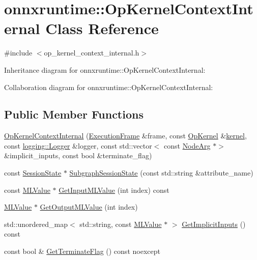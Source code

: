 \hypertarget{classonnxruntime_1_1OpKernelContextInternal}{}\section{onnxruntime\+:\+:Op\+Kernel\+Context\+Internal Class Reference}
\label{classonnxruntime_1_1OpKernelContextInternal}


{\ttfamily \#include $<$op\+\_\+kernel\+\_\+context\+\_\+internal.\+h$>$}



Inheritance diagram for onnxruntime\+:\+:Op\+Kernel\+Context\+Internal\+:


Collaboration diagram for onnxruntime\+:\+:Op\+Kernel\+Context\+Internal\+:
\subsection*{Public Member Functions}
\begin{DoxyCompactItemize}
\item 
\mbox{\hyperlink{classonnxruntime_1_1OpKernelContextInternal_a12d48f3bc46ae4ec1bc6c0825da2a21f}{Op\+Kernel\+Context\+Internal}} (\mbox{\hyperlink{classonnxruntime_1_1ExecutionFrame}{Execution\+Frame}} \&frame, const \mbox{\hyperlink{classonnxruntime_1_1OpKernel}{Op\+Kernel}} \&\mbox{\hyperlink{mkldnn_2nn_2pool_8cc_a1fd14bdce0b9db48a6bf8c6ce1320490}{kernel}}, const \mbox{\hyperlink{classonnxruntime_1_1logging_1_1Logger}{logging\+::\+Logger}} \&logger, const std\+::vector$<$ const \mbox{\hyperlink{classonnxruntime_1_1NodeArg}{Node\+Arg}} $\ast$$>$ \&implicit\+\_\+inputs, const bool \&terminate\+\_\+flag)
\item 
const \mbox{\hyperlink{classonnxruntime_1_1SessionState}{Session\+State}} $\ast$ \mbox{\hyperlink{classonnxruntime_1_1OpKernelContextInternal_ae6c150d6d6d27669b65f556b45be25ce}{Subgraph\+Session\+State}} (const std\+::string \&attribute\+\_\+name)
\item 
const \mbox{\hyperlink{classonnxruntime_1_1MLValue}{M\+L\+Value}} $\ast$ \mbox{\hyperlink{classonnxruntime_1_1OpKernelContextInternal_a3144560a95fe27fb7cfbcdb91415a886}{Get\+Input\+M\+L\+Value}} (int index) const
\item 
\mbox{\hyperlink{classonnxruntime_1_1MLValue}{M\+L\+Value}} $\ast$ \mbox{\hyperlink{classonnxruntime_1_1OpKernelContextInternal_a30c4d27e0424e71e71ca65d111ed413d}{Get\+Output\+M\+L\+Value}} (int index)
\item 
std\+::unordered\+\_\+map$<$ std\+::string, const \mbox{\hyperlink{classonnxruntime_1_1MLValue}{M\+L\+Value}} $\ast$ $>$ \mbox{\hyperlink{classonnxruntime_1_1OpKernelContextInternal_a6b9ba81c79b1899a7aee0154691e0761}{Get\+Implicit\+Inputs}} () const
\item 
const bool \& \mbox{\hyperlink{classonnxruntime_1_1OpKernelContextInternal_af38fb99b3a485d343ecbad2926c0c921}{Get\+Terminate\+Flag}} () const noexcept
\end{DoxyCompactItemize}
